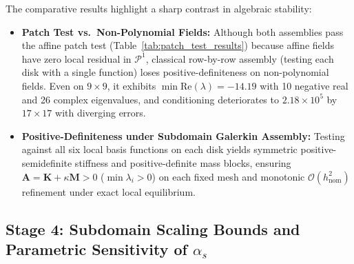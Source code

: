 \documentclass[VANCOUVER]{USG}
\begin{document}
The comparative results highlight a sharp contrast in algebraic stability:
\begin{itemize}
    \item \textbf{Patch Test vs.\ Non-Polynomial Fields:} Although both assemblies pass the affine patch test (Table~\ref{tab:patch_test_results}) because affine fields have zero local residual in $\mathcal{P}^1$, classical row-by-row assembly (testing each disk with a single function) loses positive-definiteness on non-polynomial fields. Even on $9 \times 9$, it exhibits $\min\mathrm{Re}(\lambda) = -14.19$ with 10 negative real and 26 complex eigenvalues, and conditioning deteriorates to $2.18 \times 10^5$ by $17 \times 17$ with diverging errors.
    \item \textbf{Positive-Definiteness under Subdomain Galerkin Assembly:} Testing against all six local basis functions on each disk yields symmetric positive-semidefinite stiffness and positive-definite mass blocks, ensuring $\mathbf{A} = \mathbf{K} + \kappa\mathbf{M} > 0$ ($\min \lambda_i > 0$) on each fixed mesh and monotonic $\mathcal{O}(h_{\mathrm{nom}}^2)$ refinement under exact local equilibrium.
\end{itemize}

\subsection{Stage 4: Subdomain Scaling Bounds and Parametric Sensitivity of $\alpha_s$}
\label{subsec:stage4_alpha_s}
\end{document}
